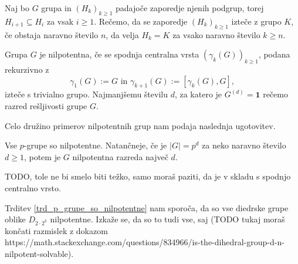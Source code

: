 \documentclass[mat1, tisk]{fmfdelo}
\numberwithin{equation}{section}  %
\begin{document}

\begin{definicija}
\label{def_iztek_zaporedja}
Naj bo $G$ grupa in $(H_k)_{k \ge 1}$ padajoče zaporedje njenih podgrup, torej $H_{i + 1} \subseteq H_{i}$ za vsak $i \ge 1$. 
Rečemo, da se zaporedje $(H_k)_{k \ge 1}$ izteče z grupo $K$, če obstaja naravno število $n$, da velja $H_k = K$ za vsako naravno število $k \ge n$.
\end{definicija}


\begin{definicija}
\label{def_nilpotentna_grupa}
Grupa $G$ je nilpotentna, če se spodnja centralna vrsta $(\gamma_k(G))_{k \ge 1}$, podana rekurzivno z \begin{equation*}
\gamma_1(G) := G \text{ in } \gamma_{k +1}(G) := [\gamma_k(G), G],
\end{equation*}  
izteče s trivialno grupo. Najmanjšemu številu $d$, za katero je $G^{(d)} = \mathbf{1}$ rečemo razred rešljivosti grupe $G$.    
\end{definicija}

Celo družino primerov nilpotentnih grup nam podaja naslednja ugotovitev.

\begin{trditev}
\label{trd_p_grupe_so_nilpotentne}
    Vse $p$-grupe so nilpotentne. Natančneje, če je $\lvert G \rvert  = p^{d}$ za neko naravno število $d \ge 1$, potem je $G$ nilpotentna razreda največ $d$. 
\end{trditev}
\begin{dokaz}
    TODO, tole ne bi smelo biti težko, samo moraš paziti, da je v skladu s spodnjo centralno vrsto.
\end{dokaz}

\begin{primer}
Trditev \ref{trd_p_grupe_so_nilpotentne} nam sporoča, da so vse diedrske grupe oblike $D_{2 \cdot 2^{k}}$ nilpotentne. Izkaže se, da so to tudi vse, saj (TODO tukaj moraš končati razmislek z dokazom https://math.stackexchange.com/questions/834966/is-the-dihedral-group-d-n-nilpotent-solvable). 
\end{primer}
\end{document}

